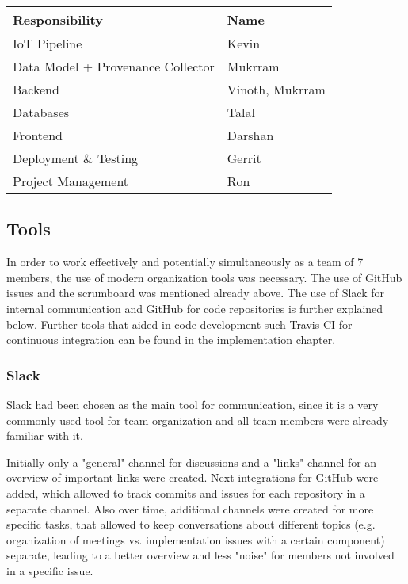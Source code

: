 \renewcommand{\arraystretch}{1.4}
\begin{center}
 \begin{tabular}{| m{18em} m{10em} |} 
 \hline
 Responsibility & Name  \\
 \hline\hline
 IoT Pipeline & Kevin \\ 
 \hline
Data Model + Provenance Collector & Mukrram \\
 \hline
 Backend & Vinoth, Mukrram \\
 \hline
 Databases & Talal \\
 \hline
 Frontend & Darshan \\ 
 \hline
 Deployment \& Testing & Gerrit \\
 \hline
Project Management & Ron \\
 \hline
\end{tabular}
\label{table:responsibilities}
\end{center}

\subsection{Tools}

In order to work effectively and potentially simultaneously as a team of 7 members, the use of modern organization tools was necessary. 
The use of GitHub issues and the scrumboard was mentioned already above. 
The use of Slack for internal communication and GitHub for code repositories is further explained below. 
Further tools that aided in code development such Travis CI for continuous integration can be found in the implementation chapter.

\subsubsection{Slack}

Slack had been chosen as the main tool for communication, since it is a very commonly used tool for team organization and all team members were already familiar with it. 

Initially only a "general" channel for discussions and a "links" channel for an overview of important links were created.
Next integrations for GitHub were added, which allowed to track commits and issues for each repository in a separate channel.
Also over time, additional channels were created for more specific tasks, that allowed to keep conversations about different topics (e.g. organization of meetings vs. implementation issues with a certain component) separate, leading to a better overview and less "noise" for members not involved in a specific issue.

